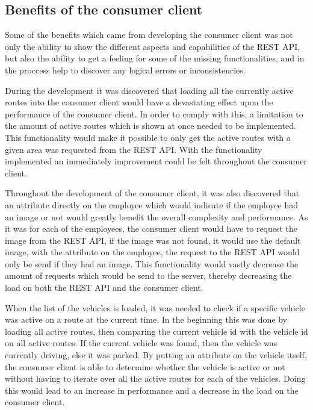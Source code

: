 \subsection{Benefits of the consumer client}\label{ssec:benefits_consumer_client}
Some of the benefits which came from developing the consumer client was not only the ability to show the different aspects and capabilities of the REST API, but also the ability to get a feeling for some of the missing functionalities, and in the proccess help to discover any logical errors or inconsistencies.

\bigskip
During the development it was discovered that loading all the currently active routes into the consumer client would have a devastating effect upon the performance of the consumer client.
In order to comply with this, a limitation to the amount of active routes which is shown at once needed to be implemented.
This functionality would make it possible to only get the active routes with a given area was requested from the REST API.
With the functionality implemented an immediately improvement could be felt throughout the consumer client.

\bigskip
Throughout the development of the consumer client, it was also discovered that an attribute directly on the employee which would indicate if the employee had an image or not would greatly benefit the overall complexity and performance.
As it was for each of the employees, the consumer client would have to request the image from the REST API, if the image was not found, it would use the default image, with the attribute on the employee, the request to the REST API would only be send if they had an image.
This functionality would vastly decrease the amount of requests which would be send to the server, thereby decreasing the load on both the REST API and the consumer client.

\bigskip
When the list of the vehicles is loaded, it was needed to check if a specific vehicle was active on a route at the current time.
In the beginning this was done by loading all active routes, then comparing the current vehicle id with the vehicle id on all active routes.
If the current vehicle was found, then the vehicle was currently driving, else it was parked.
By putting an attribute on the vehicle itself, the consumer client is able to determine whether the vehicle is active or not without having to iterate over all the active routes for each of the vehicles.
Doing this would lead to an increase in performance and a decrease in the  load on the consumer client.

